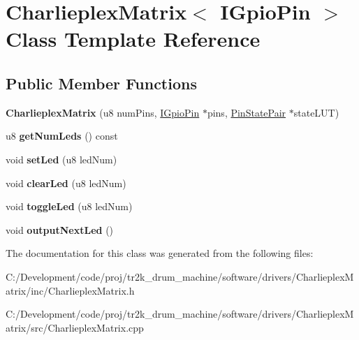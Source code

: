 \hypertarget{class_charlieplex_matrix}{}\section{Charlieplex\+Matrix$<$ I\+Gpio\+Pin $>$ Class Template Reference}
\label{class_charlieplex_matrix}
\subsection*{Public Member Functions}
\begin{DoxyCompactItemize}
\item 
\mbox{\label{class_charlieplex_matrix_a07f98ca40fcf53274aaf1328a8fb0dec}} 
{\bfseries Charlieplex\+Matrix} (u8 num\+Pins, \mbox{\hyperlink{class_i_gpio_pin}{I\+Gpio\+Pin}} $\ast$pins, \mbox{\hyperlink{struct_pin_state_pair}{Pin\+State\+Pair}} $\ast$state\+L\+UT)
\item 
\mbox{\label{class_charlieplex_matrix_a4c7a0afa35a3d99ba67f7e6488580b25}} 
u8 {\bfseries get\+Num\+Leds} () const
\item 
\mbox{\label{class_charlieplex_matrix_a27d6a06d18f558839e428f473f412bcb}} 
void {\bfseries set\+Led} (u8 led\+Num)
\item 
\mbox{\label{class_charlieplex_matrix_a2e3680edfbb6cfa78d3130a159d6e8de}} 
void {\bfseries clear\+Led} (u8 led\+Num)
\item 
\mbox{\label{class_charlieplex_matrix_a248cc77e95c3e0419fc340108ad69459}} 
void {\bfseries toggle\+Led} (u8 led\+Num)
\item 
\mbox{\label{class_charlieplex_matrix_ad0ed5f4d640e56c24d4a9a9de62c78c7}} 
void {\bfseries output\+Next\+Led} ()
\end{DoxyCompactItemize}


The documentation for this class was generated from the following files\+:\begin{DoxyCompactItemize}
\item 
C\+:/\+Development/code/proj/tr2k\+\_\+drum\+\_\+machine/software/drivers/\+Charlieplex\+Matrix/inc/Charlieplex\+Matrix.\+h\item 
C\+:/\+Development/code/proj/tr2k\+\_\+drum\+\_\+machine/software/drivers/\+Charlieplex\+Matrix/src/Charlieplex\+Matrix.\+cpp\end{DoxyCompactItemize}
